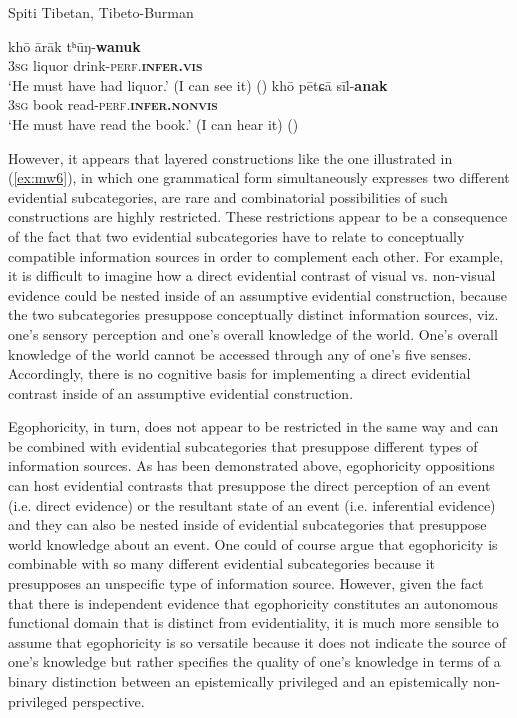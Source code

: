 \documentclass[output=paper]{langsci/langscibook}
\begin{document}
\begin{exe}
	\ex Spiti Tibetan, Tibeto-Burman\label{ex:mw6}
	\begin{xlist}
	\ex \label{ex:mw6a}
	\gll khō	 ārāk tʰūŋ-\textbf{wanuk}\\
	3\textsc{sg}	 liquor drink-\textsc{perf}.\textbf{\textsc{infer}.\textsc{vis}}\\
	\trans ‘He must have had liquor.’ (I can see it) (\citealt[46]{Hein2001})
	\ex \label{ex:mw6b}
	\gll khō pētɕā sīl-\textbf{anak}\\
	3\textsc{sg} book read-\textsc{perf}.\textbf{\textsc{infer}.\textsc{nonvis}}\\
	\trans ‘He must have read the book.’ (I can hear it) (\citealt[46]{Hein2001})
	\end{xlist}
\end{exe}


However, it appears that layered constructions like the one illustrated in (\ref{ex:mw6}), in which one grammatical form simultaneously expresses two different evidential subcategories, are rare and combinatorial possibilities of such constructions are highly restricted. These restrictions appear to be a consequence of the fact that two evidential subcategories have to relate to conceptually compatible information sources in order to complement each other. For example, it is difficult to imagine how a direct evidential contrast of visual vs. non-visual evidence could be nested inside of an assumptive evidential construction, because the two subcategories presuppose conceptually distinct information sources, viz. one’s sensory perception and one’s overall knowledge of the world. One’s overall knowledge of the world cannot be accessed through any of one’s five senses. Accordingly, there is no cognitive basis for implementing a direct evidential contrast inside of an assumptive evidential construction.

Egophoricity, in turn, does not appear to be restricted in the same way and can be combined with evidential subcategories that presuppose different types of information sources. As has been demonstrated above, egophoricity oppositions can host evidential contrasts that presuppose the direct perception of an event (i.e. direct evidence) or the resultant state of an event (i.e. inferential evidence) and they can also be nested inside of evidential subcategories that presuppose world knowledge about an event. One could of course argue that egophoricity is combinable with so many different evidential subcategories because it presupposes an unspecific type of information source. However, given the fact that there is independent evidence that egophoricity constitutes an autonomous functional domain that is distinct from evidentiality, it is much more sensible to assume that egophoricity is so versatile because it does not indicate the source of one’s knowledge but rather specifies the quality of one’s knowledge in terms of a binary distinction between an epistemically privileged and an epistemically non-privileged perspective.
\end{document}
